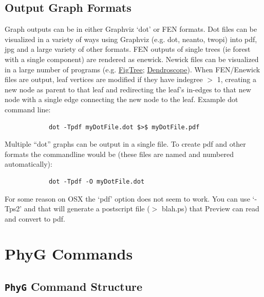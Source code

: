 \documentclass[11pt]{book}
\newcommand{\phyg}{\texttt{PhyG} }
\begin{document}
{{\section{Output Graph Formats}
	Graph outputs can be in either Graphviz `dot' or FEN formats.  Dot files can be visualized in a variety of ways 
	using Graphviz (e.g. dot, neanto, twopi) into pdf, jpg and a large variety of other formats. FEN outputs of 
	single trees (ie forest with a single component) are rendered as enewick.  Newick files can be visualized in a 
	large number of programs (e.g. \href{http://tree.bio.ed.ac.uk/software/figtree/}{FigTree}; 
	\href{http:/https://uni-tuebingen.de/fakultaeten/mathematisch-naturwissenschaftliche-fakultaet/fachbereiche/informatik/lehrstuehle/algorithms-in-bioinformatics/software/}
	{Dendroscope}). 	
	When FEN/Enewick files are output, leaf vertices are modified if they have indegree $>$ 1, creating a new node as parent to that leaf
	and redirecting the leaf's in-edges to that new node with a single edge connecting the new node to the leaf.  Example dot command line: 
	
		\begin{verbatim}
			dot -Tpdf myDotFile.dot $>$ myDotFile.pdf
		\end{verbatim}
		
	Multiple ``dot'' graphs can be output in a single file.  To create pdf and other formats the
	commandline would be (these files are named and numbered automatically):
	
		\begin{verbatim}
			dot -Tpdf -O myDotFile.dot
		\end{verbatim}
		
	For some reason on OSX the `pdf' option does not seem to work.  You can use `-Tps2' and that will generate 
	a postscript file ($>$ blah.ps) that Preview can read and convert to pdf.

	

	
\chapter{PhyG Commands}

\section{\phyg Command Structure}
		
}}
\end{document}
